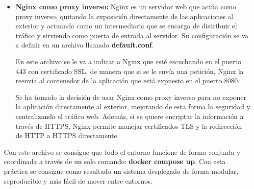 \begin{itemize}
    \item \textbf{Nginx como proxy inverso:} Nginx es un servidor web que actúa como proxy inverso, quitando la exposición directamente de las aplicaciones al exterior y actuando como un intermediario
    que se encarga de distribuir el tráfico y sirviendo como puerta de entrada al servidor. Su configuración se va a definir en un archivo llamado \textbf{default.conf}.

    En este archivo se le va a indicar a Nginx que esté escuchando en el puerto 443 con certificado SSL, de manera que si se le envía una petición, Nginx la reenvía al contenedor de la aplicación que 
    está expuesto en el puerto 8080.

    Se ha tomado la decisión de usar Nginx como proxy inverso para no exponer la aplicación directamente al exterior, mejorando de esta forma la seguridad y centralizando el tráfico web. Además, si se
    quiere encriptar la información a través de HTTPS, Nginx permite manejar certificados TLS y la redirección de HTTP a HTTPS directamente.
\end{itemize}

Con este archivo se consigue que todo el entorno funcione de forma conjunta y coordinada a través de un solo comando: \textbf{docker compose up}. Con esta práctica se consigue como resultado un sistema 
desplegado de forma modular, reproducible y más fácil de mover entre entornos.





